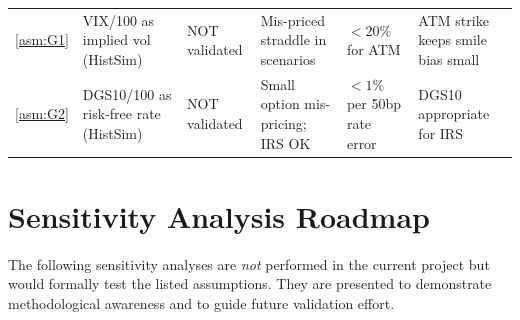 \documentclass[11pt,a4paper]{article}
\begin{document}
\begin{footnotesize}
\begin{longtable}{@{}p{0.65cm} p{4.0cm} p{2.6cm} p{3.4cm} p{2.0cm} p{2.8cm}@{}}
\cref{asm:G1}  & VIX/100 as implied vol (HistSim) & NOT validated & Mis-priced straddle in scenarios & $<20\%$ for ATM & ATM strike keeps smile bias small \\[4pt]

\cref{asm:G2}  & DGS10/100 as risk-free rate (HistSim) & NOT validated & Small option mis-pricing; IRS OK & $<1\%$ per 50bp rate error & DGS10 appropriate for IRS \\[4pt]

\end{longtable}
\end{footnotesize}

\section{Sensitivity Analysis Roadmap}\label{sec:sensitivity-roadmap}

The following sensitivity analyses are \emph{not} performed in the current
project but would formally test the listed assumptions. They are presented
to demonstrate methodological awareness and to guide future validation effort.
\end{document}

